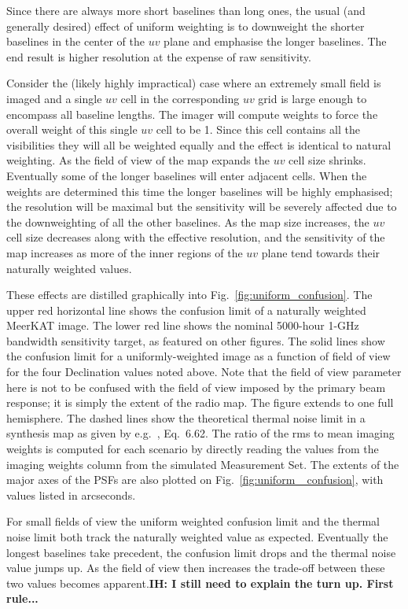 \documentclass{aa}
\begin{document}
Since there are always more short baselines than long ones, the usual (and generally desired) effect of uniform weighting is to downweight the shorter baselines in the center of the $uv$ plane and emphasise the longer baselines. The end result is higher resolution at the expense of raw sensitivity.

Consider the (likely highly impractical) case where an extremely small field is imaged and a single $uv$ cell in the corresponding $uv$ grid is large enough to encompass all baseline lengths. The imager will compute weights to force the overall weight of this single $uv$ cell to be 1. Since this cell contains all the visibilities they will all be weighted equally and the effect is identical to natural weighting. As the field of view of the map expands the $uv$ cell size shrinks. Eventually some of the longer baselines will enter adjacent cells. When the weights are determined this time the longer baselines will be highly emphasised; the resolution will be maximal but the sensitivity will be severely affected due to the downweighting of all the other baselines. As the map size increases, the $uv$ cell size decreases along with the effective resolution, and the sensitivity of the map increases as more of the inner regions of the $uv$ plane tend towards their naturally weighted values.

These effects are distilled graphically into Fig.~\ref{fig:uniform_confusion}. The upper red horizontal line shows the confusion limit of a naturally weighted MeerKAT image. The lower red line shows the nominal 5000-hour 1-GHz bandwidth sensitivity target, as featured on other figures. The solid lines show the confusion limit for a uniformly-weighted image as a function of field of view for the four Declination values noted above. Note that the field of view parameter here is not to be confused with the field of view imposed by the primary beam response; it is simply the extent of the radio map. The figure extends to one full hemisphere. The dashed lines show the theoretical thermal noise limit in a synthesis map as given by e.g.~\citet{tms1}, Eq.~6.62. The ratio of the rms to mean imaging weights is computed for each scenario by directly reading the values from the imaging weights column from the simulated Measurement Set. The extents of the major axes of the PSFs are also plotted on Fig.~\ref{fig:uniform_
confusion}, with values listed in arcseconds.

For small fields of view the uniform weighted confusion limit and the thermal noise limit both track the naturally weighted value as expected. Eventually the longest baselines take precedent, the confusion limit drops and the thermal noise value jumps up. As the field of view then increases the trade-off between these two values becomes apparent.{\bf IH: I still need to explain the turn up. First rule...}
\end{document}
